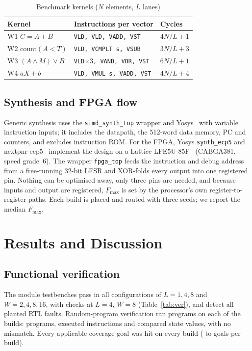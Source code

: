 \documentclass[conference]{IEEEtran}
\begin{document}
\begin{table}[t]
\centering
\caption{Benchmark kernels ($N$ elements, $L$ lanes)}
\label{tab:work}
\footnotesize
\setlength{\tabcolsep}{4pt}
\begin{tabular}{@{}lll@{}}
\toprule
Kernel & Instructions per vector & Cycles \\
\midrule
W1 $C=A+B$ & \texttt{VLD, VLD, VADD, VST} & $4N/L+1$ \\
W2 count$(A<T)$ & \texttt{VLD, VCMPLT s, VSUB} & $3N/L+3$ \\
W3 $(A\wedge M)\vee B$ & \texttt{VLD}$\times$3\texttt{, VAND, VOR, VST} & $6N/L+1$ \\
W4 $aX+b$ & \texttt{VLD, VMUL s, VADD, VST} & $4N/L+4$ \\
\bottomrule
\end{tabular}
\end{table}

\subsection{Synthesis and FPGA flow}
Generic synthesis uses the \texttt{simd\_synth\_top} wrapper and
Yosys~\cite{yosys} with variable instruction inputs; it includes the datapath,
the 512-word data memory, PC and counters, and excludes instruction ROM.
For the FPGA, Yosys \texttt{synth\_ecp5} and nextpnr-ecp5~\cite{shah2019}
implement the design on a Lattice LFE5U-85F~\cite{ecp5ds} (CABGA381, speed
grade~6). The wrapper \texttt{fpga\_top} feeds the instruction and debug
address from a free-running 32-bit LFSR and XOR-folds every output into one
registered pin. Nothing can be optimised away, only three pins are needed, and
because inputs and output are registered, $F_{\max}$ is set by the processor's
own register-to-register paths. Each build is placed and routed with three
seeds; we report the median $F_{\max}$.

\section{Results and Discussion}
\label{sec:results}

\subsection{Functional verification}
The module testbenches pass in all \MatrixConfigs{} configurations of
$L=1,4,8$ and $W=2,4,8,16$, with \ModuleChecks{} checks at $L=4$, $W=8$
(Table~\ref{tab:ver}), and detect all \UnitMutDetected{} planted RTL faults.
Random-program verification ran \RandPerBuild{} programs on each of the
\RandBuilds{} builds: \RandPrograms{} programs, \RandInstr{} executed
instructions and \RandValues{} compared state values, with no mismatch. Every
applicable coverage goal was hit on every build (\RandGoalsMin{} to
\RandGoalsMax{} goals per build).
\end{document}
